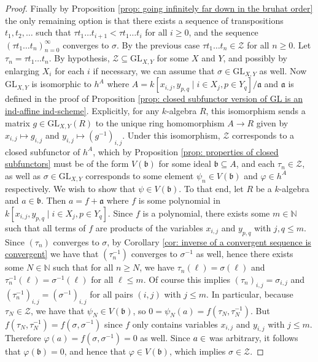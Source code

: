 \documentclass[oneside,11pt]{amsart}
\newcommand{\nn}{\ensuremath{\mathbb{N}}}
\newcommand{\mZ}{\ensuremath{\mathcal{Z}}}
\newcommand{\fa}{\ensuremath{\mathfrak{a}}}
\newcommand{\fb}{\ensuremath{\mathfrak{b}}}
\newcommand{\GL}{\ensuremath{\text{GL}}}
\theoremstyle{definition}
\newtheorem{proof techniques}{Proof Techniques}
\begin{document}
\begin{proof}
Finally by Proposition \ref{prop: going infinitely far down in the bruhat order} the only remaining option is that there exists a sequence of transpositions $t_1, t_2, \ldots $ such that $\tau t_1 \ldots t_{i + 1} < \tau t_1 \ldots t_{i}$ for all $i \geq 0$, and the sequence $(\tau t_1 \ldots t_n)_{n = 0}^\infty$ converges to $\sigma$. By the previous case $\tau t_1 \ldots t_n \in\mZ$ for all $n \geq 0$. Let $\tau_n = \tau t_1 \ldots t_n$. By hypothesis, $\mZ \subseteq \GL_{X , Y}$ for some $X$ and $Y$, and possibly by enlarging $X_{i}$ for each $i$ if necessary, we can assume that $\sigma \in \GL_{X ,Y}$ as well. Now $\GL_{X , Y}$ is isomorphic to $h^A$ where $A = k[x_{i , j} , y_{p , q} \mid i \in X_j , p \in Y_q ] / \mathfrak{a}$ and $\fa$ is defined in the proof of Proposition \ref{prop: closed subfunctor version of GL is an ind-affine ind-scheme}. Explicitly, for any $k$-algebra $R$, this isomorphism sends a matrix $g \in \GL_{X , Y}(R)$ to the unique ring homomorphism $A \to R$ given by $x_{ i , j } \mapsto g_{i , j}$ and $y_{i , j} \mapsto (g^{-1})_{i , j}$. Under this isomorphism, $\mZ$ corresponds to a closed subfunctor of $h^A$, which by Proposition \ref{prop: properties of closed subfunctors} must be of the form $V(\fb)$ for some ideal $\fb \subseteq A$, and each $\tau_n \in \mZ$, as well as $\sigma \in \GL_{X , Y}$ corresponds to some element $\psi_n \in V(\fb)$ and $\varphi \in h^A$ respectively. We wish to show that $\psi \in V(\fb)$. To that end, let $R$ be a $k$-algebra and $a \in \fb$. Then $a = f + \mathfrak{a}$ where $f$ is some polynomial in $k[x_{i , j} , y_{p , q} \mid i \in X_j , p \in Y_q]$. Since $f$ is a polynomial, there exists some $m \in \nn$ such that all terms of $f$ are products of the variables $x_{i, j}$ and $y_{p , q}$ with $j , q \leq m$. Since $(\tau_n)$ converges to $\sigma$, by Corollary \ref{cor: inverse of a convergent sequence is convergent} we have that $(\tau^{-1}_n)$ converges to $\sigma^{-1}$ as well, hence there exists some $N \in \nn$ such that for all $n \geq N$, we have $\tau_n(\ell) = \sigma(\ell)$ and $\tau_n^{-1}(\ell) = \sigma^{-1}(\ell)$ for all $\ell \leq m$. Of course this implies $(\tau_n)_{i, j} = \sigma_{i, j}$ and $(\tau_n^{-1})_{i, j} = (\sigma^{-1})_{i, j}$ for all pairs $(i, j)$ with $j \leq m$. In particular, because $\tau_N \in \mZ$, we have that $\psi_N \in V(\fb)$, so $0 = \psi_N(a) = f(\tau_N, \tau_N^{-1})$. But $f(\tau_N, \tau_N^{-1}) = f(\sigma, \sigma^{-1})$ since $f$ only contains variables $x_{i , j}$ and $y_{i , j}$ with $j \leq m$. Therefore $\varphi(a) = f(\sigma, \sigma^{-1}) = 0$ as well. Since $a  \in \bf$ was arbitrary, it follows that $\varphi(\fb) = 0$, and hence that $\varphi \in V(\fb)$, which implies $\sigma \in \mZ$. 
\end{proof}
\end{document}
